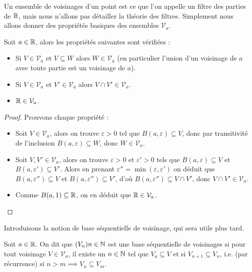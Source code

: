 Un ensemble de voisinages d'un point est ce que l'on appelle un filtre des parties de $\mathbb{R}$, mais nous n'allons pas détailler la théorie des filtres. Simplement nous allons donner des propriétés basiques des ensembles $\mathcal V_a$.

\begin{prop}
    Soit $a\in\mathbb{R}$, alors les propriétés suivantes sont vérifiées :
    \begin{itemize}[label=$\bullet$]
        \item Si $V\in\mathcal V_a$ et $V\subseteq W$ alors $W\in\mathcal V_a$ (en particulier l'union d'un voisinage de $a$ avec toute partie est un voisinage de $a$).
        \item Si $V\in\mathcal V_a$ et $V'\in\mathcal V_a$ alors $V\cap V'\in\mathcal V_a$.
        \item $\mathbb{R}\in\mathcal V_a$.
    \end{itemize}
\end{prop}

\begin{proof}
    Prouvons chaque propriété :
    \begin{itemize}[label=$\bullet$]
        \item Soit $V\in\mathcal V_a$, alors on trouve $\varepsilon > 0$ tel que $B(a,\varepsilon)\subseteq V$, donc par transitivité de l'inclusion $B(a,\varepsilon)\subseteq W$, donc $W\in\mathcal V_a$.
        \item Soit $V,V'\in\mathcal V_a$, alors on trouve $\varepsilon > 0$ et $\varepsilon' > 0$ tels que $B(a,\varepsilon) \subseteq V$ et $B(a,\varepsilon')\subseteq V'$. Alors en prenant $\varepsilon'' = \min(\varepsilon,\varepsilon')$ on déduit que $B(a,\varepsilon'')\subseteq V$ et $B(a,\varepsilon'')\subseteq V'$, d'où $B(a,\varepsilon'')\subseteq V\cap V'$, donc $V\cap V'\in\mathcal V_a$.
        \item Comme $B(a,1)\subseteq \mathbb{R}$, on en déduit que $\mathbb{R}\in\mathcal V_a$.
    \end{itemize}
\end{proof}

Introduisons la notion de base séquentielle de voisinage, qui sera utile plus tard.

\begin{defi}
    Soit $a\in\mathbb{R}$. On dit que $(V_n){n\in\mathbb{N}}$ est une base séquentielle de voisinages si pour tout voisinage $V\in\mathcal V_a$, il existe un $n\in\mathbb{N}$ tel que $V_a\subseteq V$ et si $V_{n+1}\subseteq V_n$, i.e. (par récurrence) si $n > m \implies V_n\subseteq V_m$.
\end{defi}

